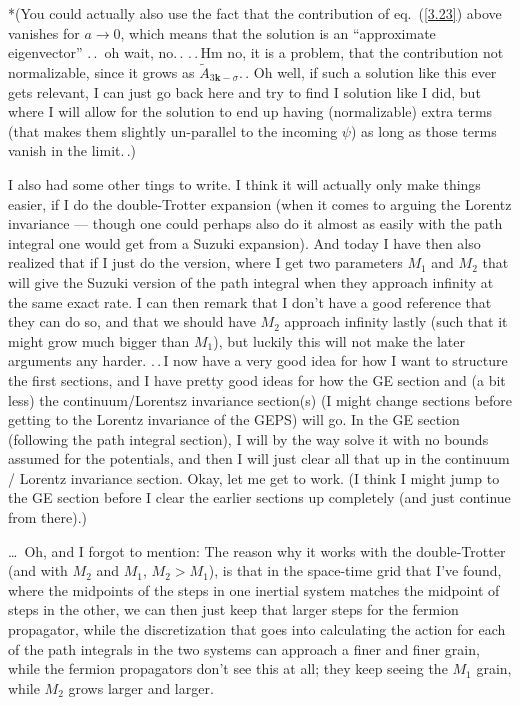 \documentclass{report}
\begin{document}
*(You could actually also use the fact that the contribution of eq.\ (\ref{3.23}) above vanishes for $a\to 0$, which means that the solution is an ``approximate eigenvector'' .\,.\ oh wait, no.\,. .\,.\,Hm no, it is a problem, that the contribution not normalizable, since it grows as $\tilde A_{3\boldsymbol{k}-\sigma}$.\,. Oh well, if such a solution like this ever gets relevant, I can just go back here and try to find I solution like I did, but where I will allow for the solution to end up having (normalizable) extra terms (that makes them slightly un-parallel to the incoming $\psi$) as long as those terms vanish in the limit.\,.)


I also had some other tings to write. I think it will actually only make things easier, if I do the double-Trotter expansion (when it comes to arguing the Lorentz invariance --- though one could perhaps also do it almost as easily with the path integral one would get from a Suzuki expansion). And today I have then also realized that if I just do the version, where I get two parameters $M_1$ and $M_2$ that will give the Suzuki version of the path integral when they approach infinity at the same exact rate. I can then remark that I don't have a good reference that they can do so, and that we should have $M_2$ approach infinity lastly (such that it might grow much bigger than $M_1$), but luckily this will not make the later arguments any harder. .\,.\,I now have a very good idea for how I want to structure the first sections, and I have pretty good ideas for how the GE section and (a bit less) the continuum/Lorentsz invariance section(s) (I might change sections before getting to the Lorentz invariance of the GEPS) will go. In the GE section (following the path integral section), I will by the way solve it with no bounds assumed for the potentials, and then I will just clear all that up in the continuum / Lorentz invariance section. Okay, let me get to work. (I think I might jump to the GE section before I clear the earlier sections up completely (and just continue from there).) %

\ldots\ Oh, and I forgot to mention: The reason why it works with the double-Trotter (and with $M_2$ and $M_1$, $M_2>M_1$), is that in the space-time grid that I've found, where the midpoints of the steps in one inertial system matches the midpoint of steps in the other, we can then just keep that larger steps for the fermion propagator, while the discretization that goes into calculating the action for each of the path integrals in the two systems can approach a finer and finer grain, while the fermion propagators don't see this at all; they keep seeing the $M_1$ grain, while $M_2$ grows larger and larger. %
\end{document}
